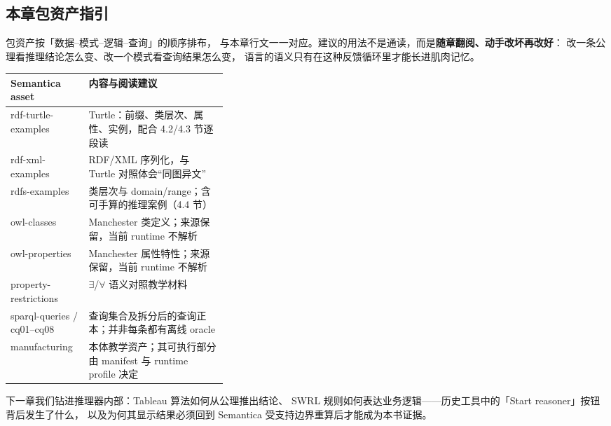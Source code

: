 \subsection{本章包资产指引}

包资产按「数据--模式--逻辑--查询」的顺序排布，
与本章行文一一对应。建议的用法不是通读，而是\textbf{随章翻阅、动手改坏再改好}：
改一条公理看推理结论怎么变、改一个模式看查询结果怎么变，
语言的语义只有在这种反馈循环里才能长进肌肉记忆。

\begin{center}
\begin{tabularx}{\linewidth}{@{}>{\ttfamily\footnotesize}p{0.36\linewidth}X@{}}
\toprule
\normalfont\textbf{Semantica asset} & \textbf{内容与阅读建议} \\
\midrule
rdf-turtle-examples & Turtle：前缀、类层次、属性、实例，配合 4.2/4.3 节逐段读 \\
rdf-xml-examples & RDF/XML 序列化，与 Turtle 对照体会“同图异文” \\
rdfs-examples & 类层次与 domain/range；含可手算的推理案例（4.4 节） \\
owl-classes & Manchester 类定义；来源保留，当前 runtime 不解析 \\
owl-properties & Manchester 属性特性；来源保留，当前 runtime 不解析 \\
property-restrictions & \(\exists\)/\(\forall\) 语义对照教学材料 \\
sparql-queries / cq01--cq08 & 查询集合及拆分后的查询正本；并非每条都有离线 oracle \\
manufacturing & 本体教学资产；其可执行部分由 manifest 与 runtime profile 决定 \\
\bottomrule
\end{tabularx}
\end{center}

下一章我们钻进推理器内部：Tableau 算法如何从公理推出结论、
SWRL 规则如何表达业务逻辑——历史工具中的「Start reasoner」按钮背后发生了什么，
以及为何其显示结果必须回到 Semantica 受支持边界重算后才能成为本书证据。

